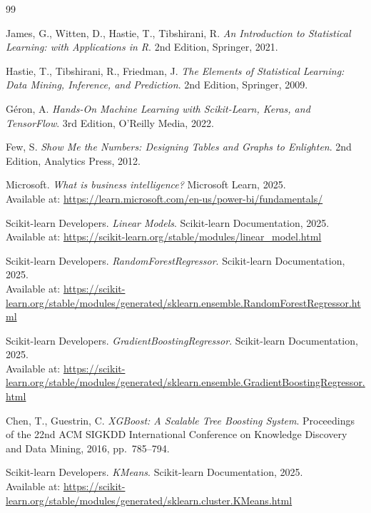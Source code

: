 \documentclass[oneside, a4paper]{book}
\theoremstyle{plain}
\theoremstyle{plain}
\theoremstyle{remark}
\theoremstyle{definition}
\theoremstyle{remark}
\begin{document}
	{\sloppy
		\begin{thebibliography}{99}
			
			James, G., Witten, D., Hastie, T., Tibshirani, R.
			\textit{An Introduction to Statistical Learning: with Applications in R}.
			2nd Edition, Springer, 2021.
			
			Hastie, T., Tibshirani, R., Friedman, J.
			\textit{The Elements of Statistical Learning: Data Mining, Inference, and Prediction}.
			2nd Edition, Springer, 2009.
			
			Géron, A.
			\textit{Hands-On Machine Learning with Scikit-Learn, Keras, and TensorFlow}.
			3rd Edition, O'Reilly Media, 2022.
			
			Few, S.
			\textit{Show Me the Numbers: Designing Tables and Graphs to Enlighten}.
			2nd Edition, Analytics Press, 2012.
			
			Microsoft.
			\textit{What is business intelligence?}
			Microsoft Learn, 2025.\\
			Available at: \url{https://learn.microsoft.com/en-us/power-bi/fundamentals/}
			
			Scikit-learn Developers.
			\textit{Linear Models}.
			Scikit-learn Documentation, 2025.\\
			Available at: \url{https://scikit-learn.org/stable/modules/linear_model.html}
			
			Scikit-learn Developers.
			\textit{RandomForestRegressor}.
			Scikit-learn Documentation, 2025.\\
			Available at: \url{https://scikit-learn.org/stable/modules/generated/sklearn.ensemble.RandomForestRegressor.html}
			
			Scikit-learn Developers.
			\textit{GradientBoostingRegressor}.
			Scikit-learn Documentation, 2025.\\
			Available at: \url{https://scikit-learn.org/stable/modules/generated/sklearn.ensemble.GradientBoostingRegressor.html}
			
			Chen, T., Guestrin, C.
			\textit{XGBoost: A Scalable Tree Boosting System}.
			Proceedings of the 22nd ACM SIGKDD International Conference on Knowledge Discovery and Data Mining, 2016, pp.~785--794.
			
			Scikit-learn Developers.
			\textit{KMeans}.
			Scikit-learn Documentation, 2025.\\
			Available at: \url{https://scikit-learn.org/stable/modules/generated/sklearn.cluster.KMeans.html}
			

\end{thebibliography}}
\end{document}
